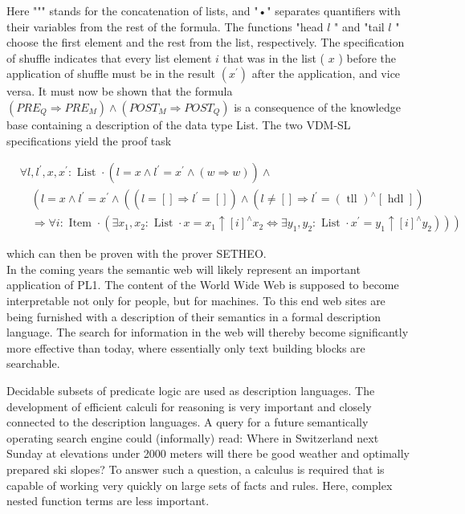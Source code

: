 \documentclass[10pt]{article}
\begin{document}
Here """ stands for the concatenation of lists, and "•" separates quantifiers with their variables from the rest of the formula. The functions "head $l$ " and "tail $l$ " choose the first element and the rest from the list, respectively. The specification of shuffle indicates that every list element $i$ that was in the list ( $x$ ) before the application of shuffle must be in the result $\left(x^{\prime}\right)$ after the application, and vice versa. It must now be shown that the formula $\left(P R E_{Q} \Rightarrow P R E_{M}\right) \wedge\left(P O S T_{M} \Rightarrow P O S T_{Q}\right)$ is a consequence of the knowledge base containing a description of the data type List. The two VDM-SL specifications yield the proof task

$$
\begin{aligned}
& \forall l, l^{\prime}, x, x^{\prime}: \text { List } \cdot\left(l=x \wedge l^{\prime}=x^{\prime} \wedge(w \Rightarrow w)\right) \wedge \\
& \quad\left(l=x \wedge l^{\prime}=x^{\prime} \wedge\left(\left(l=[] \Rightarrow l^{\prime}=[]\right) \wedge\left(l \neq[] \Rightarrow l^{\prime}=(\text { tll })^{\wedge}[\text { hdl }]\right)\right.\right. \\
& \left.\left.\quad \Rightarrow \forall i: \text { Item } \cdot\left(\exists x_{1}, x_{2}: \text { List } \cdot x=x_{1} \uparrow[i]^{\wedge} x_{2} \Leftrightarrow \exists y_{1}, y_{2}: \text { List } \cdot x^{\prime}=y_{1} \uparrow[i]^{\wedge} y_{2}\right)\right)\right)
\end{aligned}
$$

which can then be proven with the prover SETHEO.\\
In the coming years the semantic web will likely represent an important application of PL1. The content of the World Wide Web is supposed to become interpretable not only for people, but for machines. To this end web sites are being furnished with a description of their semantics in a formal description language. The search for information in the web will thereby become significantly more effective than today, where essentially only text building blocks are searchable.

Decidable subsets of predicate logic are used as description languages. The development of efficient calculi for reasoning is very important and closely connected to the description languages. A query for a future semantically operating search engine could (informally) read: Where in Switzerland next Sunday at elevations under 2000 meters will there be good weather and optimally prepared ski slopes? To answer such a question, a calculus is required that is capable of working very quickly on large sets of facts and rules. Here, complex nested function terms are less important.
\end{document}
